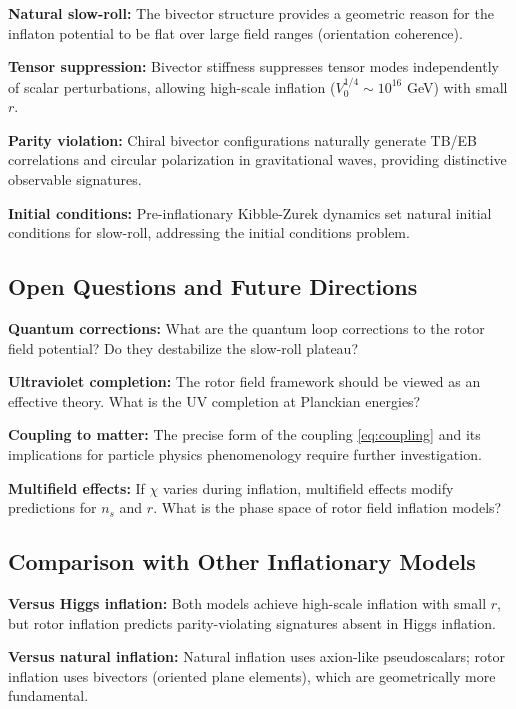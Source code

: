 \documentclass[11pt,a4paper]{article}
\numberwithin{equation}{section}
\theoremstyle{plain}
\theoremstyle{definition}
\theoremstyle{remark}
\begin{document}
\textbf{Natural slow-roll:} The bivector structure provides a geometric reason for the inflaton potential to be flat over large field ranges (orientation coherence).

\textbf{Tensor suppression:} Bivector stiffness suppresses tensor modes independently of scalar perturbations, allowing high-scale inflation ($V_0^{1/4} \sim 10^{16}$ GeV) with small $r$.

\textbf{Parity violation:} Chiral bivector configurations naturally generate TB/EB correlations and circular polarization in gravitational waves, providing distinctive observable signatures.

\textbf{Initial conditions:} Pre-inflationary Kibble-Zurek dynamics set natural initial conditions for slow-roll, addressing the initial conditions problem.

\subsection{Open Questions and Future Directions}

\textbf{Quantum corrections:} What are the quantum loop corrections to the rotor field potential? Do they destabilize the slow-roll plateau?

\textbf{Ultraviolet completion:} The rotor field framework should be viewed as an effective theory. What is the UV completion at Planckian energies?

\textbf{Coupling to matter:} The precise form of the coupling \eqref{eq:coupling} and its implications for particle physics phenomenology require further investigation.

\textbf{Multifield effects:} If $\chi$ varies during inflation, multifield effects modify predictions for $n_s$ and $r$. What is the phase space of rotor field inflation models?

\subsection{Comparison with Other Inflationary Models}

\textbf{Versus Higgs inflation:} Both models achieve high-scale inflation with small $r$, but rotor inflation predicts parity-violating signatures absent in Higgs inflation.

\textbf{Versus natural inflation:} Natural inflation uses axion-like pseudoscalars; rotor inflation uses bivectors (oriented plane elements), which are geometrically more fundamental.
\end{document}
